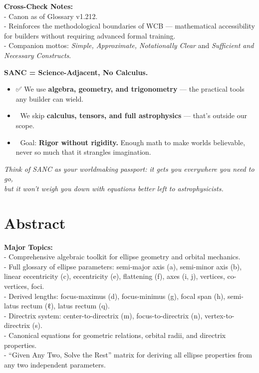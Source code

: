 \documentclass[
  letterpaper,
]{book}
\providecommand{\tightlist}{%
  \setlength{\itemsep}{0pt}\setlength{\parskip}{0pt}}
\begin{document}
\textbf{Cross-Check Notes:}\\
- Canon as of Glossary v1.212.\\
- Reinforces the methodological boundaries of WCB --- mathematical
accessibility for builders without requiring advanced formal training.\\
- Companion mottos: \emph{Simple, Approximate, Notationally Clear} and
\emph{Sufficient and Necessary Constructs}.

\textbf{SANC = Science-Adjacent, No Calculus.}

\begin{itemize}
\tightlist
\item
  ✅ We use \textbf{algebra, geometry, and trigonometry} --- the
  practical tools any builder can wield.\\
\item
  🚫 We skip \textbf{calculus, tensors, and full astrophysics} ---
  that's outside our scope.\\
\item
  🎯 Goal: \textbf{Rigor without rigidity.} Enough math to make worlds
  believable, never so much that it strangles imagination.
\end{itemize}

\emph{Think of SANC as your worldmaking passport: it gets you everywhere
you need to go,\\
but it won't weigh you down with equations better left to
astrophysicists.}

\chapter{Abstract}\label{abstract-2}

\textbf{Major Topics:}\\
- Comprehensive algebraic toolkit for ellipse geometry and orbital
mechanics.\\
- Full glossary of ellipse parameters: semi-major axis (a), semi-minor
axis (b), linear eccentricity (c), eccentricity (e), flattening (f),
axes (i, j), vertices, co-vertices, foci.\\
- Derived lengths: focus-maximus (d), focus-minimus (g), focal span (h),
semi-latus rectum (ℓ), latus rectum (q).\\
- Directrix system: center-to-directrix (m), focus-to-directrix (n),
vertex-to-directrix (s).\\
- Canonical equations for geometric relations, orbital radii, and
directrix properties.\\
- ``Given Any Two, Solve the Rest'' matrix for deriving all ellipse
properties from any two independent parameters.
\end{document}
